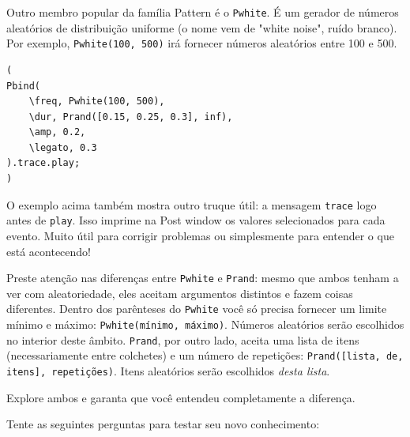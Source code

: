 Outro membro popular da família Pattern é o \texttt{Pwhite}. É um gerador de números aleatórios de distribuição uniforme (o nome vem de "white noise", ruído branco). Por exemplo, \texttt{Pwhite(100, 500)} irá fornecer números aleatórios entre 100 e 500.
 
\begin{lstlisting}[style=SuperCollider-IDE, basicstyle=\scttfamily\footnotesize]
(
Pbind(
	\freq, Pwhite(100, 500),
	\dur, Prand([0.15, 0.25, 0.3], inf),
	\amp, 0.2,
	\legato, 0.3
).trace.play;
)
\end{lstlisting}
 

O exemplo acima também mostra outro truque útil: a mensagem \texttt{trace} logo antes de \texttt{play}. Isso imprime na Post window os valores selecionados para cada evento. Muito útil para corrigir problemas ou simplesmente para entender o que está acontecendo!

Preste atenção nas diferenças entre \texttt{Pwhite} e \texttt{Prand}: mesmo que ambos tenham a ver com aleatoriedade, eles aceitam argumentos distintos e fazem coisas diferentes. Dentro dos parênteses do \texttt{Pwhite} você só precisa fornecer um limite mínimo e máximo: \texttt{Pwhite(mínimo, máximo)}. Números aleatórios serão escolhidos no interior deste âmbito. \texttt{Prand}, por outro lado, aceita uma lista de itens (necessariamente entre colchetes) e um número de repetições: \texttt{Prand([lista, de, itens], repetições)}. Itens aleatórios serão escolhidos \emph{desta lista}.

Explore ambos e garanta que você entendeu completamente a diferença.


\bigskip
{}
\bigskip
 


Tente as seguintes perguntas para testar seu novo conhecimento:

